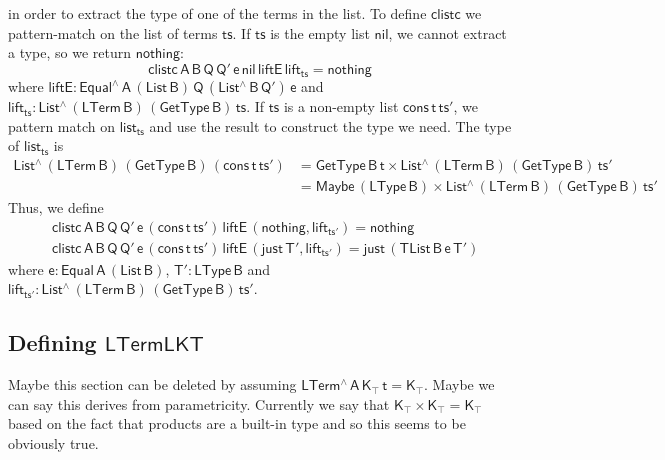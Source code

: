 \documentclass[9pt]{entcs}
\begin{document}
in order to extract the type of one of the terms in the list. 
To define $\mathsf{clistc}$ we pattern-match on the list of terms $\mathsf{ts}$.
If $\mathsf{ts}$ is the empty list $\mathsf{nil}$, we cannot extract a type, 
so we return $\mathsf{nothing}$:
\[
  \mathsf{clistc\, A\, B\, Q\, Q'\, e\, nil \, liftE\, lift_{ts} = nothing}
\]
where $\mathsf{liftE : Equal^{\wedge}\, A\, (List\,B) \, Q\, (List^{\wedge}\, B\, Q')\, e}$
and $\mathsf{lift_{ts} : List^{\wedge}\, (LTerm\, B)\, (GetType\, B)\, ts}$.
If $\mathsf{ts}$ is a non-empty list $\mathsf{cons\,t\,ts'}$,
we pattern match on $\mathsf{list_{ts}}$ and use the result to construct the type we need.
The type of $\mathsf{list_{ts}}$ is
\begin{align*}
\mathsf{List^{\wedge}\, (LTerm\, B)\, (GetType\, B)\, (cons\, t\, ts')}
&= \mathsf{GetType\, B\, t \times List^{\wedge}\, (LTerm\, B)\, (GetType\, B)\, ts'} \\
&= \mathsf{Maybe\, (LType\, B) \times List^{\wedge}\, (LTerm\, B)\, (GetType\, B)\, ts'}
\end{align*}
Thus, we define
\begin{align*}
  &\mathsf{clistc\, A\, B\, Q\, Q'\, e\, (cons\, t\, ts') \, liftE\, (nothing , lift_{ts'}) = nothing} \\
  &\mathsf{clistc\, A\, B\, Q\, Q'\, e\, (cons\, t\, ts') \, liftE\, (just\, T' , lift_{ts'}) = just \, (TList\, B\, e\, T')}
\end{align*}
where $\mathsf{e : Equal\, A\, (List\,B)}$, $\mathsf{T' : LType\, B}$
and $\mathsf{lift_{ts'} : List^{\wedge}\, (LTerm\, B)\, (GetType\, B)\, ts'}$. 



\subsection{Defining $\mathsf{LTermLKT}$}

{\color{red} Maybe this section can be deleted by assuming $\mathsf{LTerm^{\wedge}\, A\, K_\top\,t = K_\top}$.
Maybe we can say this derives from parametricity.
Currently we say that $\mathsf{K_\top \times K_\top = K_\top}$ based on the fact that products are a built-in type and so this seems to be obviously true.}
\end{document}
